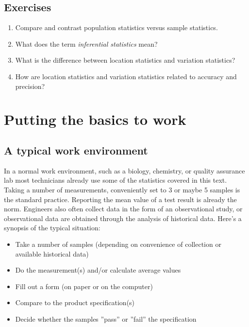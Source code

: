 \newpage
\section{Exercises}

\begin{enumerate}
\item Compare and contrast population statistics versus sample statistics.

\item What does the term \textit{inferential statistics} mean?

\item What is the difference between location statistics and variation statistics?

\item How are location statistics and variation statistics related to accuracy and precision?
\end{enumerate}

\chapter{Putting the basics to work}

\section{A typical work environment}
In a normal work environment, such as a biology, chemistry, or quality assurance lab most technicians already use some of the statistics covered in this text.  Taking a number of measurements, conveniently set to 3 or maybe 5 samples is the standard practice.  Reporting the mean value of a test result is already the norm.  Engineers also often collect data in the form of an observational study, or observational data are obtained through the analysis of historical data.
Here's a synopsis of the typical situation:
\begin{center}
  \begin{itemize}
  \item Take a number of samples (depending on convenience of collection or available historical data)
  \item Do the measurement(s) and/or calculate average values
  \item Fill out a form (on paper or on the computer)
  \item Compare to the product specification(s)
  \item Decide whether the samples ''pass'' or ''fail'' the specification
  \end{itemize}
\end{center}  
  
